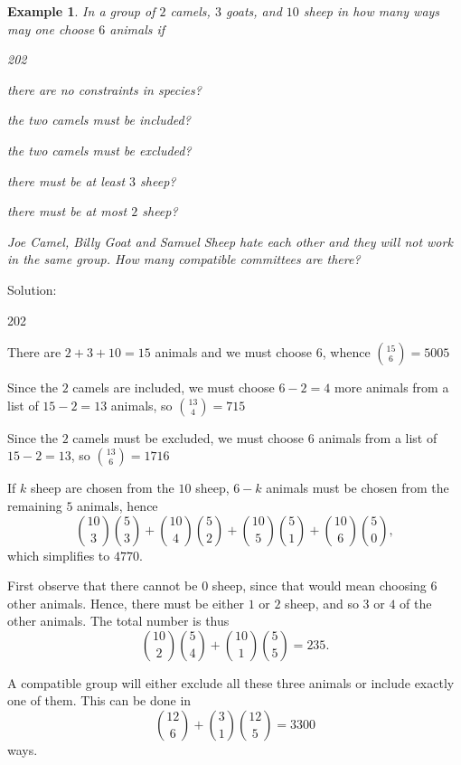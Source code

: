 \documentclass[11pt, openany]{book}
\theoremstyle{change} \theoremheaderfont{\blue\sffamily\bfseries}
\newtheorem{exa}[thm]{Example}
\theoremstyle{nonumberplain} \theoremheaderfont{\sffamily\bfseries}
\def\binom#1#2{{#1\choose#2}}
\newcommand{\í}{\'{\i}}
\begin{document}
\begin{exa}
In a group of $2$ camels, $3$ goats, and $10$ sheep in how many ways
may one choose $6$ animals if
\begin{multicols}{2}\columnseprule 1pt \columnsep 25pt

\begin{dingautolist}{202}
\item there are no constraints in species? \item the two camels
must be included? \item the two camels must be excluded? \item there
must be at least $3$ sheep? \item there must be at most $2$ sheep?
\item Joe Camel, Billy Goat and Samuel Sheep hate each other and
they will not work in the same group. How many compatible committees
are there? \end{dingautolist}
\end{multicols}
\end{exa}
Solution:
\begin{multicols}{2}\columnseprule 1pt \columnsep 25pt

\begin{dingautolist}{202}
\item  There are $2 +3+10=15$ animals and we must choose $6$, whence $\binom{15}{6} = 5005$
\item Since the $2$ camels are included, we must choose $6-2 = 4$
more animals from a list of $15-2 = 13$ animals, so
 $\binom{13}{4} = 715$\item Since the $2$ camels must be excluded, we must choose $6$ animals from a list of $15-2 = 13$, so
  $\binom{13}{6} = 1716$
\item If $k$ sheep are chosen from the $10$ sheep, $6-k$ animals must be chosen from the remaining $5$ animals, hence
 $$\binom{10}{3}\binom{5}{3} + \binom{10}{4}\binom{5}{2} + \binom{10}{5}\binom{5}{1} + \binom{10}{6}\binom{5}{0}, $$ which simplifies
 to $
 4770$.
\item  First observe that there cannot be $0$ sheep, since that would mean choosing $6$ other animals. Hence, there must be either $1$ or $2$ sheep,
and so $3$ or $4$  of the other animals. The total number is thus
$$\binom{10}{2}\binom{5}{4} + \binom{10}{1}\binom{5}{5}  = 235. $$
\item A compatible group will either exclude all these three
animals or include exactly one of them. This can be done in
$$\binom{12}{6}+ \binom{3}{1}\binom{12}{5} = 3300 $$ways.
\end{dingautolist}
\end{multicols}
\end{document}
